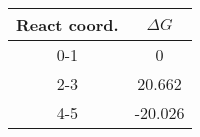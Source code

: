 \begin{tabular}{|c|c|}
    \hline
    React coord. & $\Delta G$ \\ \hline
    0-1          & 0          \\ \hline
    2-3          & 20.662     \\ \hline
    4-5          & -20.026    \\ \hline
\end{tabular}